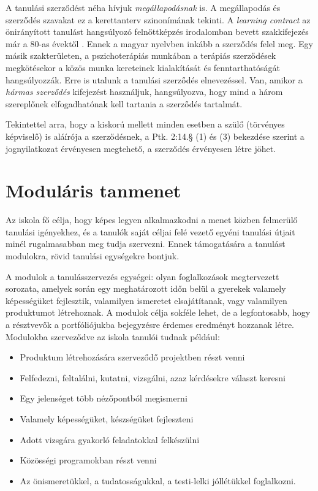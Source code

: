 A tanulási szerződést néha hívjuk \emph{megállapodásnak} is. A megállapodás és
szerződés szavakat ez a kerettanterv szinonímának tekinti. A \emph{learn\-ing
  con\-tract} az önirányított tanulást hangsúlyozó felnőttképzés irodalomban
bevett szakkifejezés már a 80-as évektől \citep{Malcolm77}. Ennek a magyar
nyelvben inkább a szerződés felel meg. Egy másik szakterületen, a
pszichoterápiás munkában a terápiás szerződések megkötésekor a közös munka
kereteinek kialakítását és fenntarthatóságát hangsúlyozzák.
\citep{pszichoterapia} Erre is utalunk a tanulási szerződés elnevezéssel. Van,
amikor a \emph{hármas szerződés} kifejezést használjuk, hangsúlyozva, hogy mind
a három szereplőnek elfogadhatónak kell tartania a szerződés tartalmát.

Tekintettel arra, hogy a kiskorú mellett minden esetben a szülő (törvényes
képviselő) is aláírója a szerződésnek, a Ptk. 2:14.§ (1) és (3) bekezdése
szerint a jognyilatkozat érvényesen megtehető, a szerződés érvényesen létre
jöhet.

\section{Moduláris tanmenet}
\label{sec:modularis_tanmenet}

Az iskola fő célja, hogy képes legyen alkalmazkodni a menet közben felmerülő
tanulási igényekhez, és a tanulók saját céljai felé vezető egyéni tanulási
útjait minél rugalmasabban meg tudja szervezni. Ennek támogatására a tanulást
modulokra, rövid tanulási egységekre bontjuk.

A modulok a tanulásszervezés egységei: olyan foglalkozások megtervezett
sorozata, amelyek során egy meghatározott időn belül a gyerekek valamely
képességüket fejlesztik, valamilyen ismeretet elsajátítanak, vagy valamilyen
produktumot létrehoznak. A modulok célja sokféle lehet, de a legfontosabb, hogy
a résztvevők a portfóliójukba bejegyzésre érdemes eredményt hozzanak létre.
Modulokba szerveződve az iskola tanulói tudnak például:

\begin{itemize}
  \item Produktum létrehozására szerveződő projektben részt venni
  \item Felfedezni, feltalálni, kutatni, vizsgálni, azaz kérdésekre választ
        keresni
  \item Egy jelenséget több nézőpontból megismerni
  \item Valamely képességüket, készségüket fejleszteni
  \item Adott vizsgára gyakorló feladatokkal felkészülni
  \item Közösségi programokban részt venni
  \item Az önismeretükkel, a tudatosságukkal, a testi-lelki jóllétükkel
        foglalkozni.
\end{itemize}

